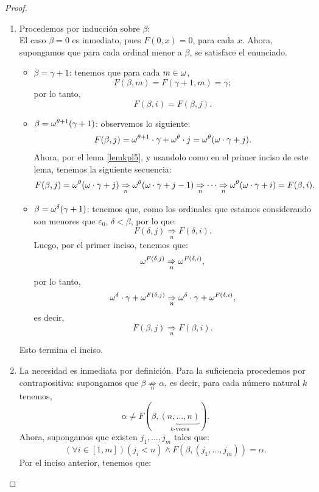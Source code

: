 \begin{proof}
\begin{enumerate}
\begin{itemize}
            \end{itemize}
            Esto concluye este inciso.
        \item Procedemos por inducción sobre $\beta$:\\
            El caso $\beta=0$ es inmediato, pues $F(0,x)=0$, para cada $x$. Ahora, supongamos que para cada ordinal menor a $\beta$, se satisface el enunciado.
            \begin{itemize}
                \item $\beta=\gamma+1$: tenemos que para cada $m\in\omega$, 
                    \[F(\beta,m)=F(\gamma+1,m)=\gamma;\]
                    por lo tanto,
                    \[F(\beta,i)=F(\beta,j).\]
                \item $\beta=\omega^{\theta+1}(\gamma+1)$: observemos lo siguiente:
                    \[F(\beta,j)=\omega^{\theta+1}\cdot\gamma+\omega^{\theta}\cdot j=\omega^{\theta}(\omega\cdot\gamma+j).\]
                    Ahora, por el lema {\ref{lemkpl5}}, y usandolo como en el primer inciso de este lema, tenemos la siguiente secuencia:
                    \[F(\beta,j)=\omega^{\theta}(\omega\cdot\gamma+j)\underset{n}{\Rightarrow}\omega^{\theta}(\omega\cdot\gamma+j-1)\underset{n}{\Rightarrow}\cdots\underset{n}{\Rightarrow}\omega^{\theta}(\omega\cdot\gamma+i)=F(\beta,i).\]
                \item $\beta=\omega^{\delta}(\gamma+1)$: tenemos que, como los ordinales que estamos considerando son menores que $\varepsilon_0$, $\delta<\beta$, por lo que:
                    \[F(\delta,j)\underset{n}{\Rightarrow}F(\delta,i).\]
                    Luego, por el primer inciso, tenemos que:
                    \[\omega^{F(\delta,j)}\underset{n}{\Rightarrow}\omega^{F(\delta,i)},\]
                    por lo tanto,
                    \[\omega^\delta\cdot\gamma+\omega^{F(\delta,j)}\underset{n}{\Rightarrow}\omega^\delta\cdot\gamma+\omega^{F(\delta,i)},\]
                    es decir,
                    \[F(\beta,j)\underset{n}{\Rightarrow}F(\beta,i).\]
            \end{itemize}
            Esto termina el inciso.
        \item La necesidad es inmediata por definición. Para la suficiencia procedemos por contrapositiva:
            supongamos que $\beta\underset{n}{\not\Rightarrow} \alpha$, es decir, para cada número natural $k$ tenemos,
            \[\alpha\neq F(\beta,\underbrace{(n,\ldots,n)}_{k\text{-veces}}).\]
            Ahora, supongamos que existen $j_1,\ldots,j_m$ tales que:
            \[(\forall i\in[1,m])(j_i<n)\land F(\beta,(j_1,\ldots,j_m))=\alpha.\]
            Por el inciso anterior, tenemos que:

\end{enumerate}
\end{proof}
